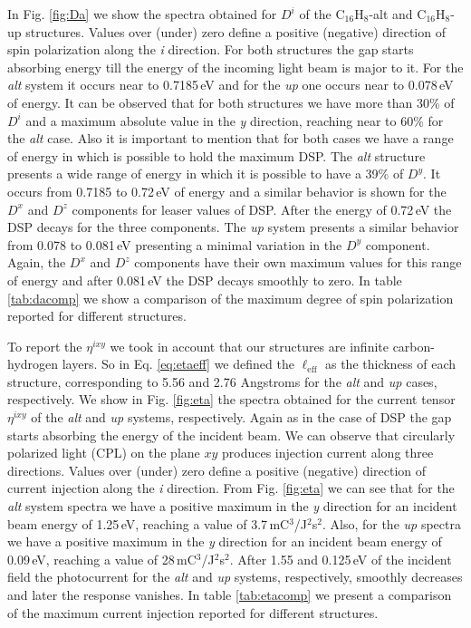 \documentclass[aps,pra,11pt,tightenlines,showpacs,superscriptaddress,groupedaddress]{revtex4-1}
\newcommand{\di}{$D^{i}$}
\newcommand{\ea}{$\eta^{ixy}$}
\newcommand{\altstc}{C$_{16}$H$_{8}$-alt}
\newcommand{\upstc}{C$_{16}$H$_{8}$-up}
\begin{document}
In Fig. \ref{fig:Da} we show the spectra obtained for
{\di} of the {\altstc} and {\upstc} structures. Values over
(under) zero define a positive (negative) direction of spin polarization along
the \emph{i} direction. 
For both structures the gap starts absorbing energy till the energy of the incoming light beam is major to it. For the \emph{alt} system it occurs near to 0.7185\,eV and for the \emph{up} one occurs near to 0.078\,eV of energy. 
It can be observed that for both structures we have
more than 30\% of {\di} and a maximum absolute value in the \emph{y} direction,
reaching near to 60\% for the \emph{alt} case. 
Also it is important to mention that for both cases we have a range of energy in which is possible to hold the maximum DSP. 
The \emph{alt} structure presents a wide range of energy in which it is possible to have a 39\% of $D^{y}$.  It occurs from  0.7185 to 0.72\,eV of energy and a similar behavior is shown for the  $D^{x}$ and $D^{z}$ components for leaser values of DSP. After the energy of 0.72\,eV the DSP decays for the three components. 
The \emph{up} system presents a similar behavior from 0.078 to 0.081\,eV presenting a minimal variation in the $D^{y}$ component. Again, the $D^{x}$ and $D^{z}$ components have their own maximum values for this range of energy and after 0.081\,eV the DSP decays smoothly to zero.
In table \ref{tab:dacomp}
we show a comparison of the maximum degree of spin polarization reported for
different structures.

To report the {\ea} we took in account that our structures are infinite 
carbon-hydrogen layers. So in Eq. \ref{eq:etaeff} we defined the 
$\ell_{\text{eff}}$
as the thickness of each structure, corresponding to 5.56 and 2.76 Angstroms for 
the \emph{alt} and \emph{up} cases, respectively. We show in Fig. \ref{fig:eta}
the spectra obtained for the current tensor {\ea} of the
\emph{alt} and \emph{up} systems, respectively. Again as in the case of DSP the gap starts absorbing the energy of the incident beam. We can observe that
circularly polarized light (CPL) on the plane $xy$ produces injection current
along three directions. Values over (under) zero define a positive (negative)
direction of current injection along the \emph{i} direction. From Fig.
\ref{fig:eta} we can see that for the \emph{alt} system spectra 
we have a positive maximum in the \emph{y} direction for an
incident beam energy of 1.25\,eV, reaching a value of
3.7\,mC$^{3}$/J$^{2}$s$^{2}$. Also, for the \emph{up} spectra 
we have a positive maximum in the \emph{y} direction for an
incident beam energy of 0.09\,eV, reaching a value of
28\,mC$^{3}$/J$^{2}$s$^{2}$. After 1.55 and 0.125\,eV of the incident field the photocurrent for the \emph{alt} and \emph{up} systems, respectively, smoothly decreases and later the response vanishes. In table \ref{tab:etacomp} we present a comparison
of the maximum current injection reported for different structures.
\end{document}
